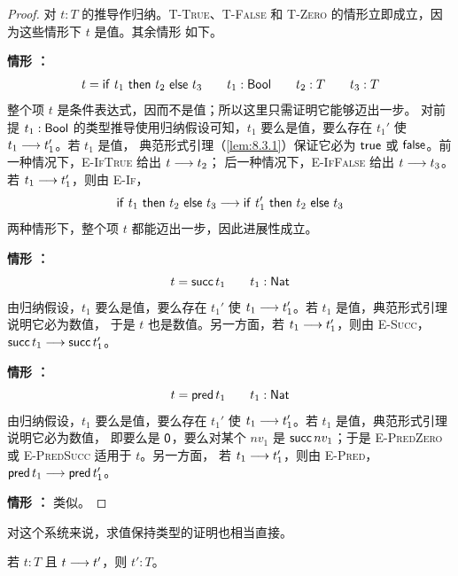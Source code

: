 \begin{proof}
对 \(t:T\) 的推导作归纳。\textsc{T-True}、\textsc{T-False} 和
\textsc{T-Zero} 的情形立即成立，因为这些情形下 \(t\) 是值。其余情形
如下。

\medskip\noindent
\textbf{情形 ：}
\[
t=\mathsf{if}\ t_1\ \mathsf{then}\ t_2\ \mathsf{else}\ t_3
\qquad t_1:\mathsf{Bool}\qquad t_2:T\qquad t_3:T
\]
整个项 \(t\) 是条件表达式，因而不是值；所以这里只需证明它能够迈出一步。
对前提 \(t_1:\mathsf{Bool}\) 的类型推导使用归纳假设可知，\(t_1\)
要么是值，要么存在 \(t_1'\) 使 \(t_1\mathrel{\longrightarrow} t_1'\)。若 \(t_1\) 是值，
典范形式引理（\cref{lem:8.3.1}）保证它必为 \(\mathsf{true}\) 或
\(\mathsf{false}\)。前一种情况下，\textsc{E-IfTrue} 给出 \(t\mathrel{\longrightarrow} t_2\)；
后一种情况下，\textsc{E-IfFalse} 给出 \(t\mathrel{\longrightarrow} t_3\)。若
\(t_1\mathrel{\longrightarrow} t_1'\)，则由 \textsc{E-If}，
\[
\mathsf{if}\ t_1\ \mathsf{then}\ t_2\ \mathsf{else}\ t_3\mathrel{\longrightarrow}\mathsf{if}\ t_1'\ \mathsf{then}\ t_2\ \mathsf{else}\ t_3
\]
两种情形下，整个项 \(t\) 都能迈出一步，因此进展性成立。

\medskip\noindent
\textbf{情形 ：}
\[
t=\mathsf{succ}\,t_1\qquad t_1:\mathsf{Nat}
\]
由归纳假设，\(t_1\) 要么是值，要么存在 \(t_1'\) 使
\(t_1\mathrel{\longrightarrow} t_1'\)。若 \(t_1\) 是值，典范形式引理说明它必为数值，
于是 \(t\) 也是数值。另一方面，若 \(t_1\mathrel{\longrightarrow} t_1'\)，则由
\textsc{E-Succ}，\(\mathsf{succ}\,t_1\mathrel{\longrightarrow}\mathsf{succ}\,t_1'\)。

\medskip\noindent
\textbf{情形 ：}
\[
t=\mathsf{pred}\,t_1\qquad t_1:\mathsf{Nat}
\]
由归纳假设，\(t_1\) 要么是值，要么存在 \(t_1'\) 使
\(t_1\mathrel{\longrightarrow} t_1'\)。若 \(t_1\) 是值，典范形式引理说明它必为数值，
即要么是 \(\mathsf{0}\)，要么对某个 \(nv_1\) 是
\(\mathsf{succ}\,nv_1\)；于是
\textsc{E-PredZero} 或 \textsc{E-PredSucc} 适用于 \(t\)。另一方面，
若 \(t_1\mathrel{\longrightarrow} t_1'\)，则由 \textsc{E-Pred}，
\(\mathsf{pred}\,t_1\mathrel{\longrightarrow}\mathsf{pred}\,t_1'\)。

\medskip\noindent
\textbf{情形 ：} 类似。
\end{proof}

对这个系统来说，求值保持类型的证明也相当直接。

\begin{theorem}[保持性]
\label{thm:8.3.3}
若 \(t:T\) 且 \(t\mathrel{\longrightarrow} t'\)，则 \(t':T\)。
\end{theorem}


